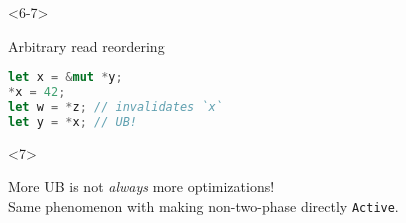 \begin{frame}[fragile, t]
    \begin{onlyenv}<6-7>
        \begin{block}{{\xmark} Arbitrary read reordering}
            \begin{lstlisting}[language=rust]
let x = &mut *y;
*x = 42;
let w = *z; // invalidates `x`
let y = *x; // UB!
            \end{lstlisting}
        \end{block}
    \end{onlyenv}

    \begin{onlyenv}<7>
        \begin{block}{}
            More UB is not \textit{always} more optimizations!\\
            Same phenomenon with making non-two-phase directly \texttt{Active}.
        \end{block}
    \end{onlyenv}
\end{frame}
